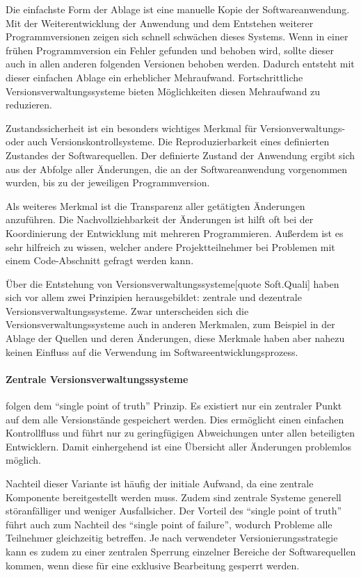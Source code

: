 Die einfachste Form der Ablage ist eine manuelle Kopie der Softwareanwendung. Mit der Weiterentwicklung der Anwendung und 
dem Entstehen weiterer Programmversionen zeigen sich schnell schwächen dieses Systems. Wenn in einer frühen 
Programmversion ein Fehler gefunden und behoben wird, sollte dieser auch in allen anderen folgenden Versionen behoben 
werden. Dadurch entsteht mit dieser einfachen Ablage ein erheblicher Mehraufwand. Fortschrittliche 
Versionsverwaltungssysteme bieten Möglichkeiten diesen Mehraufwand zu reduzieren.

Zustandssicherheit ist ein besonders wichtiges Merkmal für Versionverwaltungs- oder auch Versionskontrollsysteme.
Die Reproduzierbarkeit eines definierten Zustandes der Softwarequellen. Der definierte Zustand der Anwendung ergibt sich 
aus der Abfolge aller Änderungen, die an der Softwareanwendung vorgenommen wurden, bis zu der jeweiligen Programmversion. 

Als weiteres Merkmal ist die Transparenz aller getätigten Änderungen anzuführen. Die Nachvollziehbarkeit der Änderungen 
ist hilft oft bei der Koordinierung der Entwicklung mit mehreren Programmieren. Außerdem ist es sehr hilfreich zu wissen, 
welcher andere Projektteilnehmer bei Problemen mit einem Code-Abschnitt gefragt werden kann. 

Über die Entstehung von Versionsverwaltungssysteme[quote Soft.Quali] haben sich vor allem zwei Prinzipien herausgebildet: 
zentrale und dezentrale Versionsverwaltungssysteme. Zwar unterscheiden sich die Versionsverwaltungssysteme auch in 
anderen Merkmalen, zum Beispiel in der Ablage der Quellen und deren Änderungen, diese Merkmale haben aber nahezu keinen 
Einfluss auf die Verwendung im Softwareentwicklungsprozess.

\paragraph{Zentrale Versionsverwaltungssysteme} folgen dem ``single point of truth'' Prinzip. Es existiert nur ein 
zentraler Punkt auf dem alle Versionstände gespeichert werden. Dies ermöglicht einen einfachen Kontrollfluss und führt nur zu geringfügigen Abweichungen unter allen beteiligten Entwicklern. Damit einhergehend ist eine Übersicht aller Änderungen problemlos möglich.

Nachteil dieser Variante ist häufig der initiale Aufwand, da eine zentrale Komponente bereitgestellt werden muss. Zudem 
sind zentrale Systeme generell störanfälliger und weniger Ausfallsicher. Der Vorteil des ``single point of truth'' führt 
auch zum Nachteil des ``single point of failure'', wodurch Probleme alle Teilnehmer gleichzeitig betreffen.
Je nach verwendeter Versionierungsstrategie kann es zudem zu einer zentralen Sperrung einzelner Bereiche der Softwarequellen kommen, wenn diese für eine exklusive Bearbeitung gesperrt werden.

